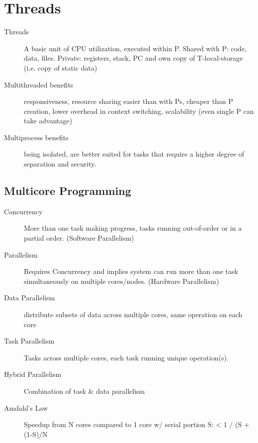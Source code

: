 \section*{Threads}
\begin{description}
  \item[Threads] A basic unit of CPU utilization, executed within P.  Shared with P: code, data, files. Private: registers, stack, PC and own copy of T-local-storage (i.e. copy of static data)
  \item[Multithreaded benefits] responsiveness, resource sharing easier than with Ps, cheaper than P creation, lower overhead in context switching, scalability (even single P can take advantage)
  \item[Multiprocess benefits] being isolated, are better suited for tasks that require a  higher degree of separation and security.  \end{description}

\subsection*{Multicore Programming}
\begin{description}
  \item[Concurrency] More than one task making progress, tasks running out-of-order or in a partial order. (Software Parallelism)
  \item[Parallelism] Requires Concurrency and implies system can run more than one task simultaneously on multiple cores/nodes. (Hardware Parallelism)
  \item[Data Parallelism] distribute subsets of data across multiple cores, same operation on each core
  \item[Task Parallelism]  Tasks across  multiple cores, each task running unique operation(s).
  \item[Hybrid Parallelism] Combination of task \& data parallelism
  \item[Amdahl's Law] Speedup from N cores compared to 1 core w/ serial portion S: < 1 / (S + (1-S)/N
\end{description}

